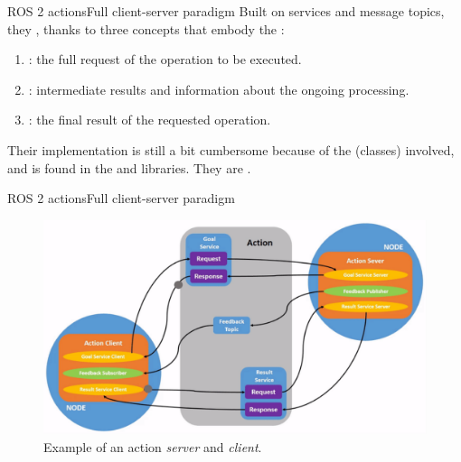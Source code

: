\begin{frame}{ROS 2 actions}{Full client-server paradigm}
  Built on services and message topics, they , thanks to three concepts that embody the :
  \begin{enumerate}
    \item {}: the full request of the operation to be executed.
    \item {}: intermediate results and information about the ongoing processing.
    \item {}: the final result of the requested operation.
  \end{enumerate}
  \vspace{.5cm}
  Their implementation is still a bit cumbersome because of the  (classes) involved, and is found in the \href{https://github.com/ros2/rclcpp/tree/humble/rclcpp_action}{} and \href{https://github.com/ros2/rclpy/tree/humble/rclpy/rclpy/action}{} libraries.
  \newline\newline
  They are .
\end{frame}
\begin{frame}{ROS 2 actions}{Full client-server paradigm}
  \begin{figure}
    \centering
    \includegraphics[scale=.37]{ros2Act.png}
    \caption{Example of an action \emph{server} and \emph{client}.}
    \label{fig:ros2Act}
  \end{figure}
\end{frame}
